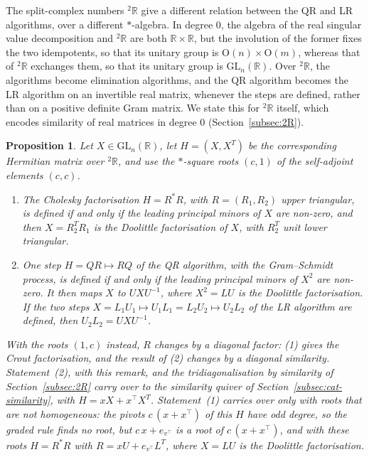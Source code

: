 \documentclass[12pt, a4paper]{report}
\theoremstyle{plain}
\newtheorem{proposition}[theorem]{Proposition}
\theoremstyle{definition}
\theoremstyle{remark}
\theoremstyle{plain}
\newcommand{\RR}{\mathbb{R}}
\newcommand{\GL}{\mathrm{GL}}
\newcommand{\Or}{\mathrm{O}}
\newcommand{\twoR}{{}^{2}\mathbb{R}}
\begin{document}
The split-complex numbers $\twoR$ give a different relation between the QR and LR algorithms, over a different $*$-algebra. In degree $0$, the algebra of the real singular value decomposition and $\twoR$ are both $\RR\times\RR$, but the involution of the former fixes the two idempotents, so that its unitary group is $\Or(n)\times\Or(m)$, whereas that of $\twoR$ exchanges them, so that its unitary group is $\GL_n(\RR)$. Over $\twoR$, the algorithms become elimination algorithms, and the QR algorithm becomes the LR algorithm on an invertible real matrix, whenever the steps are defined, rather than on a positive definite Gram matrix. We state this for $\twoR$ itself, which encodes similarity of real matrices in degree $0$ (Section~\ref{subsec:2R}).

\begin{proposition}\label{prop:2R-algorithms}
Let $X\in\GL_n(\RR)$, let $H=(X,X^T)$ be the corresponding Hermitian matrix over $\twoR$, and use the $*$-square roots $(c,1)$ of the self-adjoint elements $(c,c)$.
\begin{enumerate}
  \item The Cholesky factorisation $H=R^*R$, with $R=(R_1,R_2)$ upper triangular, is defined if and only if the leading principal minors of $X$ are non-zero, and then $X=R_2^TR_1$ is the Doolittle factorisation of $X$, with $R_2^T$ unit lower triangular.
  \item One step $H=QR\mapsto RQ$ of the QR algorithm, with the Gram--Schmidt process, is defined if and only if the leading principal minors of $X^2$ are non-zero. It then maps $X$ to $UXU^{-1}$, where $X^2=LU$ is the Doolittle factorisation. If the two steps $X=L_1U_1\mapsto U_1L_1=L_2U_2\mapsto U_2L_2$ of the LR algorithm are defined, then $U_2L_2=UXU^{-1}$.
\end{enumerate}
With the roots $(1,c)$ instead, $R$ changes by a diagonal factor: (1) gives the Crout factorisation, and the result of (2) changes by a diagonal similarity. Statement~(2), with this remark, and the tridiagonalisation by similarity of Section~\ref{subsec:2R} carry over to the similarity quiver of Section~\ref{subsec:cat-similarity}, with $H=xX+x^{\top}X^T$. Statement~(1) carries over only with roots that are not homogeneous: the pivots $c\,(x+x^{\top})$ of this $H$ have odd degree, so the graded rule finds no root, but $c\,x+e_{v^{\top}}$ is a root of $c\,(x+x^{\top})$, and with these roots $H=R^*R$ with $R=xU+e_{v^{\top}}L^T$, where $X=LU$ is the Doolittle factorisation.
\end{proposition}
\end{document}
